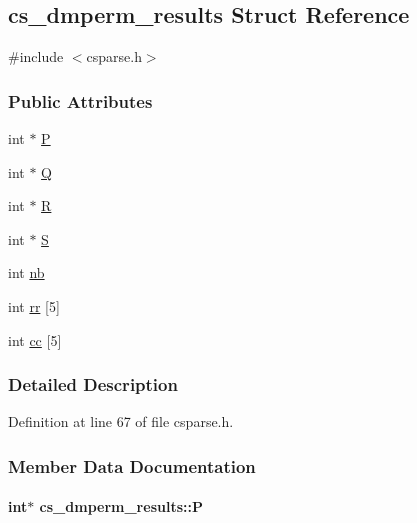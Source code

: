 \hypertarget{structcs__dmperm__results}{\subsection{cs\-\_\-dmperm\-\_\-results Struct Reference}
\label{structcs__dmperm__results}
}


{\ttfamily \#include $<$csparse.\-h$>$}

\subsubsection*{Public Attributes}
\begin{DoxyCompactItemize}
\item 
int $\ast$ \hyperlink{structcs__dmperm__results_aaa7aeb656162920573128deddc21f837}{P}
\item 
int $\ast$ \hyperlink{structcs__dmperm__results_a6d15026e4edf9c0e56fbfc7ec758bafb}{Q}
\item 
int $\ast$ \hyperlink{structcs__dmperm__results_a7962d0f1b98b88e96fdc86bfe2be4e39}{R}
\item 
int $\ast$ \hyperlink{structcs__dmperm__results_a841c1955bb06ae973c60fc68b35c9610}{S}
\item 
int \hyperlink{structcs__dmperm__results_a273a6867c52fb2c813575d73ed0d40ee}{nb}
\item 
int \hyperlink{structcs__dmperm__results_af17bae097d2ceb70ca1e8d96006bc225}{rr} \mbox{[}5\mbox{]}
\item 
int \hyperlink{structcs__dmperm__results_ae56ca45f0058903a3c1e586cff63ecef}{cc} \mbox{[}5\mbox{]}
\end{DoxyCompactItemize}


\subsubsection{Detailed Description}


Definition at line 67 of file csparse.\-h.



\subsubsection{Member Data Documentation}
\hypertarget{structcs__dmperm__results_aaa7aeb656162920573128deddc21f837}{
\paragraph[{P}]{\setlength{\rightskip}{0pt plus 5cm}int$\ast$ cs\-\_\-dmperm\-\_\-results\-::\-P}}\label{structcs__dmperm__results_aaa7aeb656162920573128deddc21f837}


